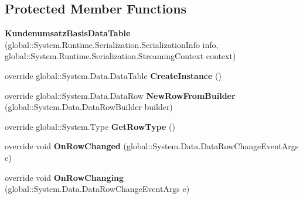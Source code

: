 \subsection*{Protected Member Functions}
\begin{DoxyCompactItemize}
\item 
{\bfseries Kundenumsatz\+Basis\+Data\+Table} (global\+::\+System.\+Runtime.\+Serialization.\+Serialization\+Info info, global\+::\+System.\+Runtime.\+Serialization.\+Streaming\+Context context)\hypertarget{class_products_1_1_data_1_1ds_sage_1_1_kundenumsatz_basis_data_table_ab180146012c891efb40167986a258d31}{}\label{class_products_1_1_data_1_1ds_sage_1_1_kundenumsatz_basis_data_table_ab180146012c891efb40167986a258d31}

\item 
override global\+::\+System.\+Data.\+Data\+Table {\bfseries Create\+Instance} ()\hypertarget{class_products_1_1_data_1_1ds_sage_1_1_kundenumsatz_basis_data_table_aa8c9ce6bca49350384a454e724a385b5}{}\label{class_products_1_1_data_1_1ds_sage_1_1_kundenumsatz_basis_data_table_aa8c9ce6bca49350384a454e724a385b5}

\item 
override global\+::\+System.\+Data.\+Data\+Row {\bfseries New\+Row\+From\+Builder} (global\+::\+System.\+Data.\+Data\+Row\+Builder builder)\hypertarget{class_products_1_1_data_1_1ds_sage_1_1_kundenumsatz_basis_data_table_a793e5ae03bdf04459d9d51363e889224}{}\label{class_products_1_1_data_1_1ds_sage_1_1_kundenumsatz_basis_data_table_a793e5ae03bdf04459d9d51363e889224}

\item 
override global\+::\+System.\+Type {\bfseries Get\+Row\+Type} ()\hypertarget{class_products_1_1_data_1_1ds_sage_1_1_kundenumsatz_basis_data_table_abaecb5c998c0136c71b0d72f738c8d3a}{}\label{class_products_1_1_data_1_1ds_sage_1_1_kundenumsatz_basis_data_table_abaecb5c998c0136c71b0d72f738c8d3a}

\item 
override void {\bfseries On\+Row\+Changed} (global\+::\+System.\+Data.\+Data\+Row\+Change\+Event\+Args e)\hypertarget{class_products_1_1_data_1_1ds_sage_1_1_kundenumsatz_basis_data_table_aa2191aa0bf60c59eeb552194b2955f5e}{}\label{class_products_1_1_data_1_1ds_sage_1_1_kundenumsatz_basis_data_table_aa2191aa0bf60c59eeb552194b2955f5e}

\item 
override void {\bfseries On\+Row\+Changing} (global\+::\+System.\+Data.\+Data\+Row\+Change\+Event\+Args e)\hypertarget{class_products_1_1_data_1_1ds_sage_1_1_kundenumsatz_basis_data_table_adeaa20b6eb0ad47a2452166405fde7c9}{}\label{class_products_1_1_data_1_1ds_sage_1_1_kundenumsatz_basis_data_table_adeaa20b6eb0ad47a2452166405fde7c9}


\end{DoxyCompactItemize}
